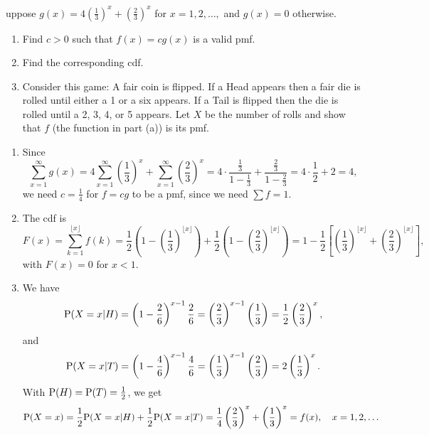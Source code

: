 \documentclass[12pt]{article}
\newcommand{\Prob}{{\rm P}}
\newenvironment{problem}[2][Problem]{\begin{trivlist}
\item[\hskip \labelsep {\bfseries #1}\hskip \labelsep {\bfseries #2.}]}
{\end{trivlist}}
\begin{document}
\begin{problem}
  Suppose $g(x) = 4\left(\frac{1}{3}\right)^x + \left(\frac{2}{3}\right)^x$
  for $x=1,2,\dots,$ and $g(x) = 0$ otherwise.
  \begin{enumerate}
    \item Find $c > 0$ such that $f(x) = cg(x)$ is a valid pmf.
    \item Find the corresponding cdf.
    \item Consider this game: A fair coin is flipped. If a Head appears
    then a fair die is rolled until either a 1 or a six appears. If a
    Tail is flipped then the die is rolled until a 2, 3, 4, or 5 appears.
    Let $X$ be the number of rolls and show that $f$ (the function in part
    (a)) is its pmf.
  \end{enumerate}
  \begin{enumerate}
    \item Since
    \[
      \sum_{x=1}^\infty g(x)=4\sum_{x=1}^\infty\!\left(\frac{1}{3}\right)^x
      +\sum_{x=1}^\infty\!\left(\frac{2}{3}\right)^x
      =4\cdot \frac{\frac{1}{3}}{1-\frac{1}{3}}+\frac{\frac{2}{3}}{1-\frac{2}{3}}
      =4\cdot\frac12+2=4,
    \]
    we need $c=\frac{1}{4}$ for $f = cg$ to be a pmf, since we need
    $\sum f = 1$.
    \item The cdf is
    \[
      F(x)=\sum_{k=1}^{\lfloor x\rfloor} f(k)
      =\frac{1}{2}\!\left(1-\left(\frac{1}{3}\right)^{\lfloor x\rfloor}\right)
      +\frac{1}{2}\!\left(1-\left(\frac{2}{3}\right)^{\lfloor x\rfloor}\right)
      =1-\frac12\!\left[\left(\frac{1}{3}\right)^{\lfloor x\rfloor}
      +\left(\frac{2}{3}\right)^{\lfloor x\rfloor}\right],
    \]
    with $F(x)=0$ for $x<1$. 
    \item We have
    \[
      \Prob(X=x|H)=\left(1-\frac26\right)^{x-1}\frac26
      =\left(\frac23\right)^{x-1}\left(\frac13\right)
      =\frac12\left(\frac23\right)^x,
    \]
    and
    \[
      \Prob(X=x|T)=\left(1-\frac46\right)^{x-1}\frac46
      =\left(\frac13\right)^{x-1}\left(\frac23\right)
      =2\left(\frac13\right)^x.
    \]
    With $\Prob(H)=\Prob(T)=\frac12$, we get
    \[
      \Prob(X=x)=\frac12\Prob(X=x|H)+\frac12\Prob(X=x|T)
      =\frac14\left(\frac23\right)^x+\left(\frac13\right)^x
      =f(x),\quad x=1,2,\dots
    \]
  \end{enumerate}
\end{problem}
\end{document}
